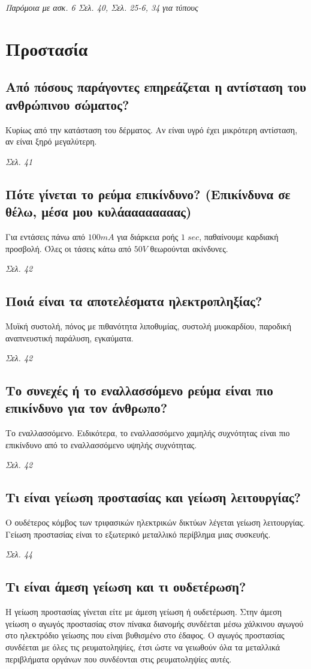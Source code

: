 \documentclass{article}
\begin{document}
\emph{Παρόμοια με ασκ. 6 Σελ. 40, Σελ. 25-6, 34 για τύπους}

\section{Προστασία}
\subsection{Από πόσους παράγοντες επηρεάζεται η αντίσταση του ανθρώπινου σώματος?}
Κυρίως από την κατάσταση του δέρματος. Αν είναι υγρό έχει μικρότερη αντίσταση, αν είναι ξηρό μεγαλύτερη.

\emph{Σελ. 41}

\subsection{Πότε γίνεται το ρεύμα επικίνδυνο? (Επικίνδυνα σε θέλω, μέσα μου κυλάαααααααας)}
Για εντάσεις πάνω από $100mA$ για διάρκεια ροής $1\;sec$, παθαίνουμε καρδιακή προσβολή. Όλες οι τάσεις κάτω από $50V$ θεωρούνται ακίνδυνες.

\emph{Σελ. 42}

\subsection{Ποιά είναι τα αποτελέσματα ηλεκτροπληξίας?}
Μυϊκή συστολή, πόνος με πιθανότητα λιποθυμίας, συστολή μυοκαρδίου, παροδική αναπνευστική παράλυση, εγκαύματα.

\emph{Σελ. 42}

\subsection{Το συνεχές ή το εναλλασσόμενο ρεύμα είναι πιο επικίνδυνο για τον άνθρωπο?}
Το εναλλασσόμενο. Ειδικότερα, το εναλλασσόμενο χαμηλής συχνότητας είναι πιο επικίνδυνο από το εναλλασσόμενο υψηλής συχνότητας.

\emph{Σελ. 42}

\subsection{Τι είναι γείωση προστασίας και γείωση λειτουργίας?}
Ο ουδέτερος κόμβος των τριφασικών ηλεκτρικών δικτύων λέγεται γείωση λειτουργίας. Γείωση προστασίας είναι το εξωτερικό μεταλλικό περίβλημα μιας συσκευής.

\emph{Σελ.  44}

\subsection{Τι είναι άμεση γείωση και τι ουδετέρωση?}
Η γείωση προστασίας γίνεται είτε με άμεση γείωση ή ουδετέρωση. Στην άμεση γείωση ο αγωγός προστασίας στον πίνακα διανομής συνδέεται μέσω χάλκινου αγωγού στο ηλεκτρόδιο
γείωσης που είναι βυθισμένο στο έδαφος. Ο αγωγός προστασίας συνδέεται με όλες τις ρευματοληψίες, έτσι ώστε να γειωθούν όλα τα μεταλλικά περιβλήματα οργάνων που συνδέονται
στις ρευματοληψίες αυτές.
\end{document}
